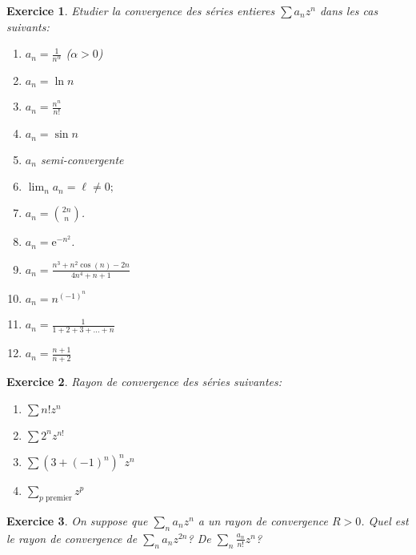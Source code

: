 \documentclass[12pt,a4paper]{article}
\newcommand{\E}{\mathrm{e}}
\theoremstyle{break}
\theoremstyle{break}
\newtheorem{Exo}{Exercice}
\begin{document}
\begin{Exo}
	Etudier la convergence des séries entieres $\sum a_{n}z^{n}$ dans
	les cas suivants:
	\begin{multicols}{3}
		\begin{enumerate}
			\item $a_{n}=\frac{1}{n^{\alpha }}$ ($\alpha >0$)
			
			\item $a_{n}=\ln n$
			
			\item $a_{n}=\frac{n^{n}}{n!}$
			
			\item $a_{n}=\sin n$
			
			\item $a_{n}$ semi-convergente
			
			\item $\lim_{n}a_{n}=\ell\neq 0;$
			\item $a_n=\binom{2n}{n}$.
			\item
			$a_n=\E^{-n^2}$.
			\item
			$a_n=\frac{n^3+n^2\cos(n)-2n}{4n^4+n+1}$
			\item $a_n=n^{(-1)^n}$
			\item
			$a_n=\frac{1}{1+2+3+...+n}$
			\item $a_n=\frac{n+1}{n+2}$
		\end{enumerate}
	\end{multicols}
\end{Exo}



\begin{Exo}
	Rayon de convergence des séries suivantes:
	\begin{multicols}{4}
		\begin{enumerate}
			\item $\sum n!z^{n}$
			
			\item $\sum 2^{n}z^{n!}$
			
			\item $\sum (3+(-1)^{n})^n z^{n}$
			
			\item $\underset{p\text{ premier}}{\sum }z^{p}$
		\end{enumerate}
	\end{multicols}
\end{Exo}



\begin{Exo}
	On suppose que $\sum_n a_n z^n$ a un rayon de convergence $R>0$. Quel est le rayon de convergence de $\sum_n a_n z^{2n}$? De $\sum_n \frac{a_n}{n!}z^n$?
\end{Exo}
\end{document}

